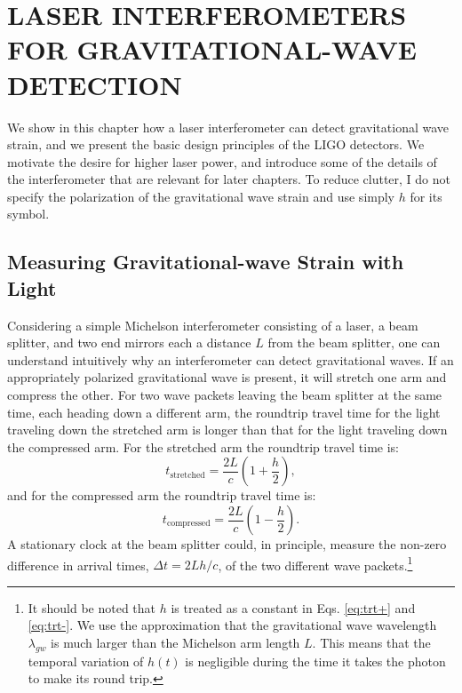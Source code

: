 \chapter{LASER INTERFEROMETERS FOR GRAVITATIONAL-WAVE DETECTION}

We show in this chapter how a laser interferometer can detect
gravitational wave strain, and we present the basic design principles
of the LIGO detectors. We motivate the desire for higher laser power,
and introduce some of the details of the interferometer that are
relevant for later chapters. To reduce clutter, I do not specify the
polarization of the gravitational wave strain and use simply $h$ for
its symbol. 


\section{Measuring Gravitational-wave Strain with Light}
Considering a simple Michelson interferometer consisting of a laser, a
beam splitter, and two end mirrors each a distance $L$ from the beam
splitter, one can understand intuitively why an interferometer can
detect gravitational waves. If an appropriately polarized
gravitational wave is present, it will stretch one arm and compress
the other. For two wave packets leaving the beam splitter at the same
time, each heading down a different arm, the roundtrip travel time for
the light traveling down the stretched arm is longer than that for the
light traveling down the compressed arm. For the stretched arm the
roundtrip travel time is:
\begin{equation}
t_{\mathrm{stretched}} = \frac{2 L}{c} \left( 1 + \frac{h}{2} \right),
\label{eq:trt+} 
\end{equation}
and for the compressed arm the roundtrip travel time is:
\begin{equation}
t_{\mathrm{compressed}} = \frac{2 L}{c} \left( 1 - \frac{h}{2} \right).
\label{eq:trt-} 
\end{equation}
A stationary clock at the beam splitter could, in principle, measure
the non-zero difference in arrival times, $\Delta t = 2Lh/c$, of the
two different wave packets.\footnote{It should be noted that $h$ is
  treated as a constant in Eqs. \ref{eq:trt+} and \ref{eq:trt-}. We
  use the approximation that the gravitational wave wavelength
  $\lambda_{gw}$ is much larger than the Michelson arm length
  $L$. This means that the temporal variation of $h(t)$ is negligible
  during the time it takes the photon to make its round trip.}

